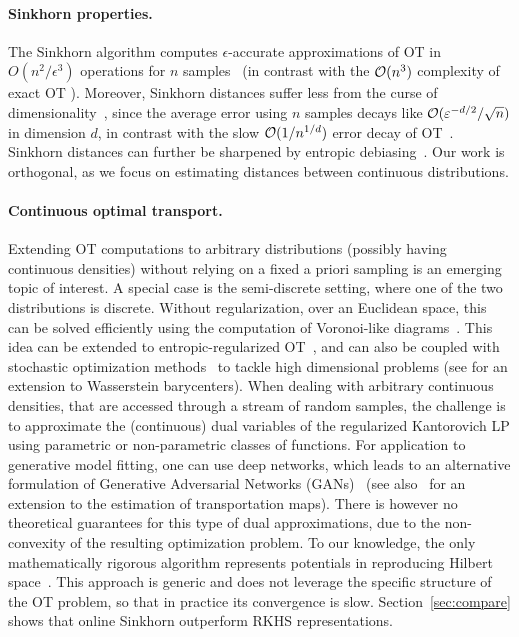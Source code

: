 \paragraph{Sinkhorn properties.} The Sinkhorn algorithm computes $\epsilon$-accurate
approximations of OT in $O(n^2/\epsilon^3)$ operations for $n$
samples~\citep{altschuler2017near} (in contrast with the $\mathcal{O}(n^3)$ complexity of exact OT \cite{goldberg1989finding}). Moreover, Sinkhorn distances suffer less from the
curse of dimensionality~\citep{2019-Genevay-aistats}, since the average error
using $n$ samples decays like $\mathcal{O}(\varepsilon^{-d/2}/\sqrt{n})$ in dimension
$d$, in contrast with the slow $\mathcal{O}(1/n^{1/d})$ error decay of
OT~\citep{dudley_speed_1969,weed2019sharp}. Sinkhorn distances can further be sharpened
by entropic debiasing~\citep{2019-Feydy-aistats}. Our work is orthogonal, as we focus on estimating distances between continuous distributions.

\paragraph{Continuous optimal transport.} Extending OT computations to arbitrary
distributions (possibly having continuous densities) without relying on a fixed
a priori sampling is an emerging topic of interest. A special case is the
semi-discrete setting, where one of the two distributions is discrete. Without
regularization, over an Euclidean space, this can be solved efficiently using
the computation of Voronoi-like diagrams~\citep{merigot2011multiscale}. This
idea can be extended to entropic-regularized OT~\citep{cuturi2018semidual}, and
can also be coupled with stochastic optimization
methods~\citep{2016-genevay-nips} to tackle high dimensional problems (see
 \cite{staib2017parallel} for an extension to Wasserstein barycenters). When dealing with arbitrary continuous densities, that are accessed through a
stream of random samples, the challenge is to approximate  the (continuous) dual
variables of the regularized Kantorovich LP using parametric or non-parametric
classes of functions. For application to generative model fitting, one can use
deep networks, which leads to an alternative formulation of Generative
Adversarial Networks (GANs)~\citep{arjovsky2017wgan} (see
also~\citet{seguy2018large} for an extension to the estimation of transportation
maps). There is however no theoretical guarantees for this type of dual
approximations, due to the non-convexity of the resulting optimization problem.
To our knowledge, the only mathematically rigorous algorithm represents potentials in reproducing
Hilbert space~\citep{2016-genevay-nips}. This
approach is generic and does not leverage the specific structure of the OT problem, so that in practice its convergence is slow. Section~\autoref{sec:compare} shows that online Sinkhorn outperform RKHS representations.

